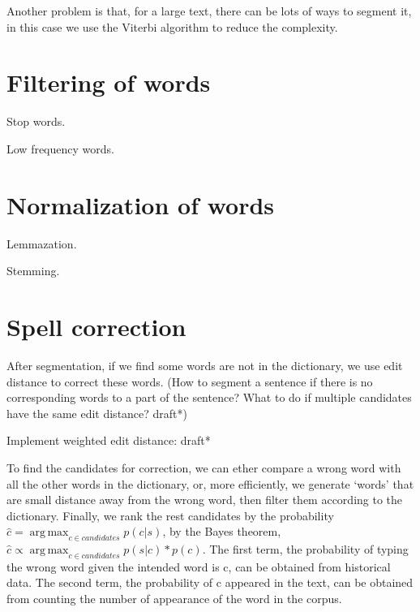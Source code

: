 \documentclass{report}
\DeclareMathOperator*{\argmax}{arg\,max}
\begin{document}
Another problem is that, for a large text, there can be lots of ways to segment it, in this case we use the Viterbi algorithm to reduce the complexity.

\section{Filtering of words}
Stop words.

Low frequency words. 

\section{Normalization of words}
Lemmazation.

Stemming.

\section{Spell correction}
After segmentation, if we find some words are not in the dictionary, we use edit distance to correct these words. (How to segment a sentence if there is no corresponding words to a part of the sentence? What to do if multiple candidates have the same edit distance? draft*)

Implement weighted edit distance: draft*

To find the candidates for correction, we can ether compare a wrong word with all the other words in the dictionary, or, more efficiently, we generate `words' that are small distance away from the wrong word, then filter them according to the dictionary. Finally, we rank the rest candidates by the probability $\hat{c} = \argmax_{c \in candidates} p(c|s)$, by the Bayes theorem, $\hat{c} \propto \argmax_{c \in candidates} p(s|c) * p(c)$. The first term, the probability of typing the wrong word given the intended word is c, can be obtained from historical data. The second term, the probability of c appeared in the text, can be obtained from counting the number of appearance of the word in the corpus.
\end{document}

